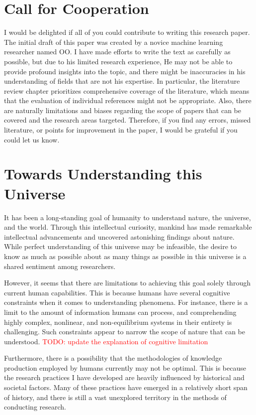 \documentclass{book}
\begin{document}
\section{Call for Cooperation}
I would be delighted if all of you could contribute to writing this research paper. The initial draft of this paper was created by a novice machine learning researcher named OO. I have made efforts to write the text as carefully as possible, but due to his limited research experience, He may not be able to provide profound insights into the topic, and there might be inaccuracies in his understanding of fields that are not his expertise. In particular, the literature review chapter prioritizes comprehensive coverage of the literature, which means that the evaluation of individual references might not be appropriate. Also, there are naturally limitations and biases regarding the scope of papers that can be covered and the research areas targeted. Therefore, if you find any errors, missed literature, or points for improvement in the paper, I would be grateful if you could let us know.



\section{Towards Understanding this Universe}
It has been a long-standing goal of humanity to understand nature, the universe, and the world. Through this intellectual curiosity, mankind has made remarkable intellectual advancements and uncovered astonishing findings about nature. While perfect understanding of this universe may be infeasible, the desire to know as much as possible about as many things as possible in this universe is a shared sentiment among researchers.

However, it seems that there are limitations to achieving this goal solely through current human capabilities. This is because humans have several cognitive constraints when it comes to understanding phenomena. For instance, there is a limit to the amount of information humans can process, and comprehending highly complex, nonlinear, and non-equilibrium systems in their entirety is challenging. Such constraints appear to narrow the scope of nature that can be understood. \textcolor{red}{TODO: update the explanation of cognitive limitation}

Furthermore, there is a possibility that the methodologies of knowledge production employed by humans currently may not be optimal. This is because the research practices I have developed are heavily influenced by historical and societal factors. Many of these practices have emerged in a relatively short span of history, and there is still a vast unexplored territory in the methods of conducting research.
\end{document}
